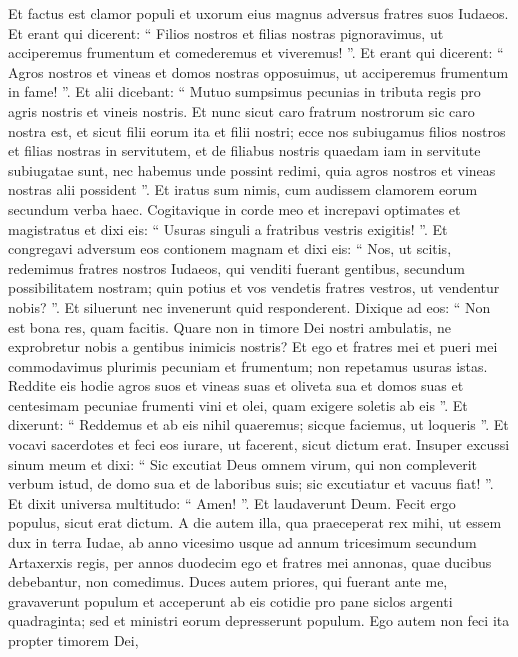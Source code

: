 \begin{biblechapter}
\begin{biblechapter}
\begin{biblechapter}
\begin{biblechapter}
\begin{biblechapter}
\verse Et factus est clamor populi et uxorum eius magnus adversus fratres suos Iudaeos. 
\verse Et erant qui dicerent: “ Filios nostros et filias nostras pignoravimus, ut acciperemus frumentum et comederemus et viveremus! ”. 
\verse Et erant qui dicerent: “ Agros nostros et vineas et domos nostras opposuimus, ut acciperemus frumentum in fame! ”. 
\verse Et alii dicebant: “ Mutuo sumpsimus pecunias in tributa regis pro agris nostris et vineis nostris. 
\verse Et nunc sicut caro fratrum nostrorum sic caro nostra est, et sicut filii eorum ita et filii nostri; ecce nos subiugamus filios nostros et filias nostras in servitutem, et de filiabus nostris quaedam iam in servitute subiugatae sunt, nec habemus unde possint redimi, quia agros nostros et vineas nostras alii possident ”.
 \verse Et iratus sum nimis, cum audissem clamorem eorum secundum verba haec. 
\verse Cogitavique in corde meo et increpavi optimates et magistratus et dixi eis: “ Usuras singuli a fratribus vestris exigitis! ”. Et congregavi adversum eos contionem magnam 
\verse et dixi eis: “ Nos, ut scitis, redemimus fratres nostros Iudaeos, qui venditi fuerant gentibus, secundum possibilitatem nostram; quin potius et vos vendetis fratres vestros, ut vendentur nobis? ”. Et siluerunt nec invenerunt quid responderent. 
\verse Dixique ad eos: “ Non est bona res, quam facitis. Quare non in timore Dei nostri ambulatis, ne exprobretur nobis a gentibus inimicis nostris? 
\verse Et ego et fratres mei et pueri mei commodavimus plurimis pecuniam et frumentum; non repetamus usuras istas. 
\verse Reddite eis hodie agros suos et vineas suas et oliveta sua et domos suas et centesimam pecuniae frumenti vini et olei, quam exigere soletis ab eis ”.
 \verse Et dixerunt: “ Reddemus et ab eis nihil quaeremus; sicque faciemus, ut loqueris ”. Et vocavi sacerdotes et feci eos iurare, ut facerent, sicut dictum erat. 
\verse Insuper excussi sinum meum et dixi: “ Sic excutiat Deus omnem virum, qui non compleverit verbum istud, de domo sua et de laboribus suis; sic excutiatur et vacuus fiat! ”. Et dixit universa multitudo: “ Amen! ”. Et laudaverunt Deum. Fecit ergo populus, sicut erat dictum.
 \verse A die autem illa, qua praeceperat rex mihi, ut essem dux in terra Iudae, ab anno vicesimo usque ad annum tricesimum secundum Artaxerxis regis, per annos duodecim ego et fratres mei annonas, quae ducibus debebantur, non comedimus. 
 \verse Duces autem priores, qui fuerant ante me, gravaverunt populum et acceperunt ab eis cotidie pro pane siclos argenti quadraginta; sed et ministri eorum depresserunt populum. Ego autem non feci ita propter timorem Dei, 

\end{biblechapter}
\end{biblechapter}
\end{biblechapter}
\end{biblechapter}
\end{biblechapter}
